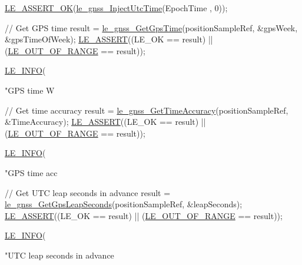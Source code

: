 \begin{DoxyCodeInclude}
{{{{{{{    \hyperlink{le__log_8h_a7cd2daa3d4af1de4d29e0eed95187484}{LE\_ASSERT\_OK}(\hyperlink{le__gnss__interface_8h_ab058224c242c97d458fcc8ad03b1f1c9}{le\_gnss\_InjectUtcTime}(EpochTime , 0));

    \textcolor{comment}{// Get GPS time}
    result = \hyperlink{le__gnss__interface_8h_a4e9966df8185978aaef75399d5aff2d3}{le\_gnss\_GetGpsTime}(positionSampleRef, &gpsWeek, &gpsTimeOfWeek);
    \hyperlink{le__log_8h_ac0dbbef91dc0fed449d0092ff0557b39}{LE\_ASSERT}((LE\_OK == result) || (\hyperlink{le__basics_8h_a1cca095ed6ebab24b57a636382a6c86caef8ecf11fa8556fd2d3ca8faab697717}{LE\_OUT\_OF\_RANGE} == result));

    \hyperlink{le__log_8h_a23e6d206faa64f612045d688cdde5808}{LE\_INFO}(\textcolor{stringliteral}{"GPS time W %

    \textcolor{comment}{// Get time accuracy}
    result = \hyperlink{le__gnss__interface_8h_ad41698ff4a68651b9fb81b862d4274f6}{le\_gnss\_GetTimeAccuracy}(positionSampleRef, &TimeAccuracy);
    \hyperlink{le__log_8h_ac0dbbef91dc0fed449d0092ff0557b39}{LE\_ASSERT}((LE\_OK == result) || (\hyperlink{le__basics_8h_a1cca095ed6ebab24b57a636382a6c86caef8ecf11fa8556fd2d3ca8faab697717}{LE\_OUT\_OF\_RANGE} == result));

    \hyperlink{le__log_8h_a23e6d206faa64f612045d688cdde5808}{LE\_INFO}(\textcolor{stringliteral}{"GPS time acc %

    \textcolor{comment}{// Get UTC leap seconds in advance}
    result = \hyperlink{le__gnss__interface_8h_a9e2b23f2420e53ca86f48a0f0c43f2d0}{le\_gnss\_GetGpsLeapSeconds}(positionSampleRef, &leapSeconds);
    \hyperlink{le__log_8h_ac0dbbef91dc0fed449d0092ff0557b39}{LE\_ASSERT}((LE\_OK == result) || (\hyperlink{le__basics_8h_a1cca095ed6ebab24b57a636382a6c86caef8ecf11fa8556fd2d3ca8faab697717}{LE\_OUT\_OF\_RANGE} == result));

    \hyperlink{le__log_8h_a23e6d206faa64f612045d688cdde5808}{LE\_INFO}(\textcolor{stringliteral}{"UTC leap seconds in advance %

}}}}}}}}}}
\end{DoxyCodeInclude}
